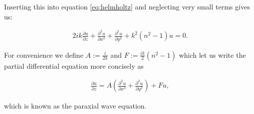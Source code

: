Inserting this into equation \eqref{eq:helmholtz} and neglecting very small terms gives us:

\begin{align*}
2 i k \frac{\partial u}{\partial z} + \frac{\partial^2 u}{\partial x^2} + \frac{\partial^2 u}{\partial y^2} + k^2 (n^2 - 1) u = 0.
\end{align*}

For convenience we define $A := \frac{i}{2k}$ and $F := \frac{ik}{2} (n^2 - 1) $ which let us write the partial differential equation more concisely as

\begin{align} \label{eq:paraxial_wave_equation}
\frac{\partial u}{\partial z} = A \left( \frac{\partial^2 u}{\partial x^2} + \frac{\partial^2 u}{\partial y^2} \right) + F  u,
\end{align}

which is known as the paraxial wave equation.
